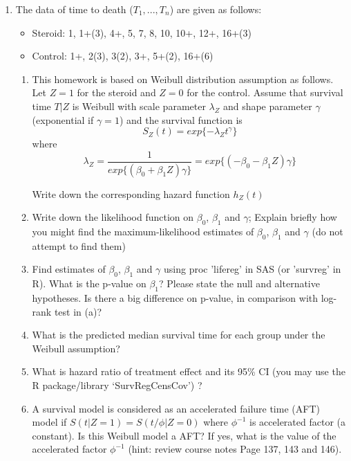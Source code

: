 \begin{enumerate}


\item The data of time to death ($T_1,...,T_n$) are given as follows:

\begin{itemize}
\item Steroid: 1, 1+(3), 4+, 5, 7, 8, 10, 10+, 12+, 16+(3)
\item Control: 1+, 2(3), 3(2), 3+, 5+(2), 16+(6)
\end{itemize}

\begin{enumerate}

\item This homework is based on Weibull distribution assumption as follows. Let $Z=1$ for the steroid and $Z = 0$ for the control. Assume that survival time $T|Z$ is Weibull with scale parameter $\lambda_Z$ and shape parameter $\gamma$ (exponential if $\gamma = 1$) and the survival function is 
$$
S_Z(t) = exp\{-\lambda_Z t^{\gamma}\}
$$
where
$$
\lambda_Z = \frac{1}{exp\{(\beta_0 + \beta_1 Z)\gamma\}} = exp\{(-\beta_0 - \beta_1 Z)\gamma\}
$$


Write down the corresponding hazard function $h_Z(t)$

\item Write down the likelihood function on $\beta_0$, $\beta_1$ and $\gamma$;  Explain briefly how you might find the maximum-likelihood estimates of $\beta_0$, $\beta_1$ and $\gamma$ (do not attempt to find them)

\item Find estimates of $\beta_0$, $\beta_1$ and $\gamma$ using proc 'lifereg' in SAS (or 'survreg' in R). What is the p-value on $\beta_1$? Please state the null and alternative hypotheses. Is there a big difference on p-value, in comparison with log-rank test in (a)?

\item What is the predicted median survival time for each group under the Weibull assumption?

\item What is hazard ratio of treatment effect and its 95\% CI (you may use the R package/library `SurvRegCensCov') ? 

\item A survival model is considered as an accelerated failure time (AFT) model if $S(t | Z=1) = S(t/\phi | Z = 0)$ where $\phi^{-1}$ is accelerated factor (a constant). Is this Weibull model a AFT? If yes, what is the value of the accelerated factor $\phi^{-1}$ (hint: review course notes Page 137, 143 and 146). 


\end{enumerate}
\end{enumerate}
